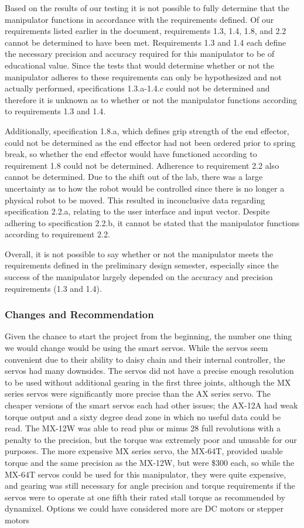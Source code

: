 
Based on the results of our testing it is not possible to fully determine that the manipulator functions in accordance with the requirements defined. Of our requirements listed earlier in the document, requirements 1.3, 1.4, 1.8, and 2.2 cannot be determined to have been met. Requirements 1.3 and 1.4 each define the necessary precision and accuracy required for this manipulator to be of educational value. Since the tests that would determine whether or not the manipulator adheres to these requirements can only be hypothesized and not actually performed, specifications 1.3.a-1.4.c could not be determined and therefore it is unknown as to whether or not the manipulator functions according to requirements 1.3 and 1.4.

Additionally, specification 1.8.a, which defines grip strength of the end effector, could not be determined as the end effector had not been ordered prior to spring break, so whether the end effector would have functioned according to requirement 1.8 could not be determined. Adherence to requirement 2.2 also cannot be determined. Due to the shift out of the lab, there was a large uncertainty as to how the robot would be controlled since there is no longer a physical robot to be moved. This resulted in inconclusive data regarding specification 2.2.a, relating to the user interface and input vector. Despite adhering to specification 2.2.b, it cannot be stated that the manipulator functions according to requirement 2.2.

Overall, it is not possible to say whether or not the manipulator meets the requirements defined in the preliminary design semester, especially since the success of the manipulator largely depended on the accuracy and precision requirements (1.3 and 1.4).
\subsubsection*{Changes and Recommendation}
Given the chance to start the project from the beginning, the number one thing we would change would be using the smart servos. While the servos seem convenient due to their ability to daisy chain and their internal controller, the servos had many downsides. The servos did not have a precise enough resolution to be used without additional gearing in the first three joints, although the MX series servos were significantly more precise than the AX series servo. The cheaper versions of the smart servos each had other issues; the AX-12A had weak torque output and a sixty degree dead zone in which no useful data could be read. The MX-12W was able to read plus or minus 28 full revolutions with a penalty to the precision, but the torque was extremely poor and unusable for our purposes. The more expensive MX series servo, the MX-64T, provided usable torque and the same precision as the MX-12W, but were \$300 each, so while the MX-64T servos could be used for this manipulator, they were quite expensive, and gearing was still necessary for angle precision and torque requirements if the servos were to operate at one fifth their rated stall torque as recommended by dynamixel. Options we could have considered more are DC motors or stepper motors

